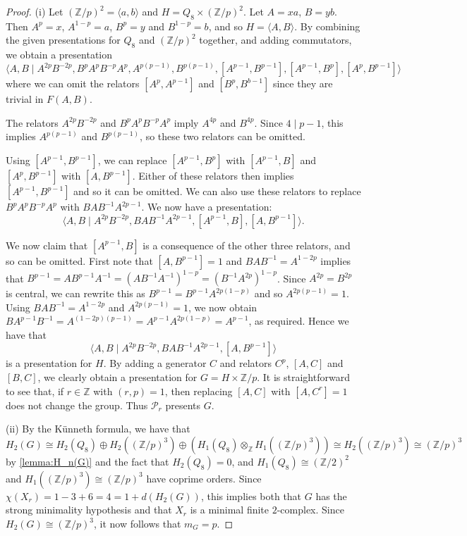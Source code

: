 \documentclass[11pt,a4paper,leqno]{amsart}
\theoremstyle{definition}
\theoremstyle{remark}
\newcommand{\Z}{\mathbb{Z}}
\begin{document}
\begin{proof}
(i)
Let $(\Z/p)^2 =\langle a, b \rangle$ and $H = Q_8 \times (\Z/p)^2$. Let $A=xa$, $B=yb$. Then $A^p=x$, $A^{1-p}=a$, $B^p=y$ and $B^{1-p}=b$, and so $H = \langle A, B \rangle$. By combining the given presentations for $Q_8$ and $(\Z/p)^2$ together, and adding commutators, we obtain a presentation
\[ \langle A, B \mid A^{2p}B^{-2p}, B^pA^pB^{-p}A^p, A^{p(p-1)}, B^{p(p-1)}, [A^{p-1},B^{p-1}],[A^{p-1},B^p], [A^p,B^{p-1}]\rangle  \]
where we can omit the relators $[A^p,A^{p-1}]$ and $[B^p,B^{b-1}]$ since they are trivial in $F(A,B)$.

The relators $A^{2p}B^{-2p}$ and $B^pA^pB^{-p}A^p$ imply $A^{4p}$ and $B^{4p}$. Since $4 \mid p-1$, this implies $A^{p(p-1)}$ and $B^{p(p-1)}$, so these two relators can be omitted.

Using $[A^{p-1},B^{p-1}]$, we can replace $[A^{p-1},B^p]$ with $[A^{p-1},B]$ and $[A^p,B^{p-1}]$ with $[A,B^{p-1}]$. Either of these relators then implies $[A^{p-1},B^{p-1}]$ and so it can be omitted. We can also use these relators to replace $B^pA^pB^{-p}A^p$ with $BAB^{-1}A^{2p-1}$.
We now have a presentation:
\[ \langle A, B \mid A^{2p}B^{-2p}, BAB^{-1}A^{2p-1}, [A^{p-1},B], [A,B^{p-1}]\rangle.  \]

We now claim that $[A^{p-1},B]$ is a consequence of the other three relators, and so can be omitted. First  note that $[A,B^{p-1}]=1$ and $BAB^{-1}=A^{1-2p}$ implies that $B^{p-1} = AB^{p-1}A^{-1} = (AB^{-1}A^{-1})^{1-p}=(B^{-1}A^{2p})^{1-p}$. Since $A^{2p}=B^{2p}$ is central, we can rewrite this as $B^{p-1} = B^{p-1}A^{2p(1-p)}$ and so $A^{2p(p-1)}=1$. Using $BAB^{-1}=A^{1-2p}$ and $A^{2p(p-1)}=1$, we now obtain $BA^{p-1}B^{-1} = A^{(1-2p)(p-1)} = A^{p-1} A^{2p(1-p)} = A^{p-1}$, as required.
Hence we have that 
\[ \langle A, B \mid A^{2p}B^{-2p}, BAB^{-1}A^{2p-1}, [A,B^{p-1}]\rangle \]
is a presentation for $H$. By adding a generator $C$ and relators $C^p$, $[A,C]$ and $[B,C]$, we clearly obtain a presentation for $G = H \times \Z/p$. It is straightforward to see that, if $r \in \Z$ with $(r,p)=1$, then replacing $[A,C]$ with $[A,C^r]=1$ does not change the group. Thus $\mathcal{P}_r$ presents $G$.

(ii) By the K\"{u}nneth formula, we have that
\[ H_2(G) \cong H_2(Q_8) \oplus H_2((\Z/p)^3) \oplus (H_1(Q_8) \otimes_{\Z} H_1((\Z/p)^3)) \cong H_2((\Z/p)^3) \cong (\Z/p)^3 \]
by \cref{lemma:H_n(G)} and the fact that $H_2(Q_8)=0$, and $H_1(Q_8) \cong (\Z/2)^2$ and $H_1((\Z/p)^3) \cong (\Z/p)^3$ have coprime orders. Since $\chi(X_r) = 1-3+6=4=1+d(H_2(G))$, this implies both that $G$ has the strong minimality hypothesis and that $X_r$ is a minimal finite $2$-complex. Since $H_2(G) \cong (\Z/p)^3$, it now follows that $m_G = p$.
\end{proof}
\end{document}
